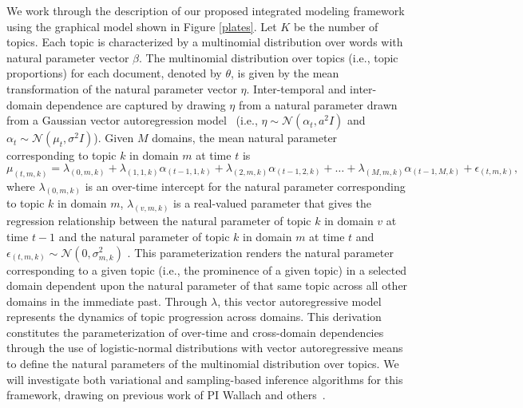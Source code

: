 We work through the description of our proposed integrated modeling
framework using the graphical model shown in Figure \ref{plates}. Let
$K$ be the number of topics. Each topic is characterized by a
multinomial distribution over words with natural parameter vector
$\beta$. The multinomial distribution over topics (i.e., topic
proportions) for each document, denoted by $\theta$, is given by the
mean transformation of the natural parameter vector
$\eta$. Inter-temporal and inter-domain dependence are captured by
drawing $\eta$ from a natural parameter drawn from a Gaussian vector
autoregression
model~\cite{Banbura2010} (i.e., $\eta \sim
\mathcal{N}\left(\alpha_t,a^2I \right)$ and $\alpha_t \sim
\mathcal{N}(\mu_t,\sigma^2I)$). Given $M$ domains, the mean natural
parameter corresponding to topic $k$ in domain $m$ at time $t$ is $$
\mu_{(t,m,k)} = \lambda_{(0,m,k)} +
\lambda_{(1,1,k)}\alpha_{(t-1,1,k)}+
\lambda_{(2,m,k)}\alpha_{(t-1,2,k)}+\hdots+\lambda_{(M,m,k)}\alpha_{(t-1,M,k)}+\epsilon_{(t,m,k)},$$
where $ \lambda_{(0,m,k)}$ is an over-time intercept for the natural
parameter corresponding to topic $k$ in domain $m$,
$\lambda_{(v,m,k)}$ is a real-valued parameter that gives the
regression relationship between the natural parameter of topic $k$ in
domain $v$ at time $t-1$ and the natural parameter of topic $k$ in
domain $m$ at time $t$ and $\epsilon_{(t,m,k)} \sim
\mathcal{N}(0,\sigma^2_{m,k})$ . This parameterization renders the
natural parameter corresponding to a given topic (i.e., the prominence
of a given topic) in a selected domain dependent upon the natural
parameter of that same topic across all other domains in the immediate
past. Through $\lambda$, this vector autoregressive model represents
the dynamics of topic progression across domains.  This derivation
constitutes the parameterization of over-time and cross-domain
dependencies through the use of logistic-normal distributions
\cite{Blei2006} with vector autoregressive means to define the natural
parameters of the multinomial distribution over topics. We will
investigate both variational and sampling-based inference algorithms
for this framework, drawing on previous work of PI Wallach and
others~\cite{Blei2006, Mimno08}.

